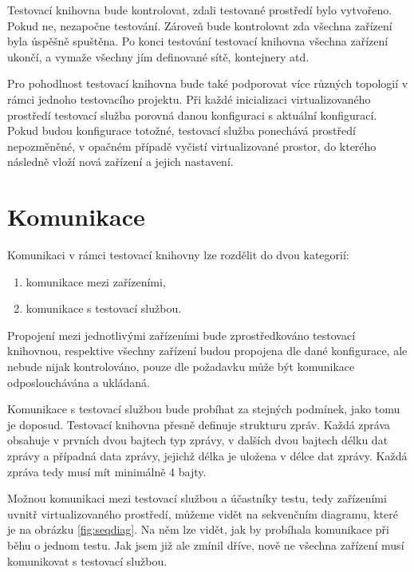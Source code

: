 Testovací knihovna bude kontrolovat, zdali testované prostředí bylo vytvořeno. Pokud ne, nezapočne testování. Zároveň bude kontrolovat zda všechna zařízení byla úspěšně spuštěna. Po konci testování testovací knihovna všechna zařízení ukončí, a vymaže všechny jím definované sítě, kontejnery atd.

Pro pohodlnost testovací knihovna bude také podporovat více různých topologií v rámci jednoho testovacího projektu. Při každé inicializaci virtualizovaného prostředí testovací služba porovná danou konfiguraci s aktuální konfigurací. Pokud budou konfigurace totožné, testovací služba ponechává prostředí nepozměněné, v opačném případě vyčistí virtualizované prostor, do kterého následně vloží nová zařízení a jejich nastavení.  


\section{Komunikace}

Komunikaci v rámci testovací knihovny lze rozdělit do dvou kategorií:

\begin{enumerate}
    \item komunikace mezi zařízeními,
    \item komunikace s testovací službou.
\end{enumerate}

Propojení mezi jednotlivými zařízeními bude zprostředkováno testovací knihovnou, respektive všechny zařízení budou propojena dle dané konfigurace, ale nebude nijak kontrolováno, pouze dle požadavku může být komunikace odposlouchávána a ukládaná. 

Komunikace s testovací službou bude probíhat za stejných podmínek, jako tomu je doposud. Testovací knihovna přesně definuje strukturu zpráv. Každá zpráva obsahuje v prvních dvou bajtech typ zprávy, v dalších dvou bajtech délku dat zprávy a případná data zprávy, jejichž délka je uložena v délce dat zprávy. Každá zpráva tedy musí mít minimálně 4 bajty. 

Možnou komunikaci mezi testovací službou a účastníky testu, tedy zařízeními uvnitř virtualizovaného prostředí, můžeme vidět na sekvenčním diagramu, které je na obrázku \ref{fig:seqdiag}. Na něm lze vidět, jak by probíhala komunikace při běhu o jednom testu. Jak jsem již ale zmínil dříve, nově ne všechna zařízení musí komunikovat s testovací službou. 

